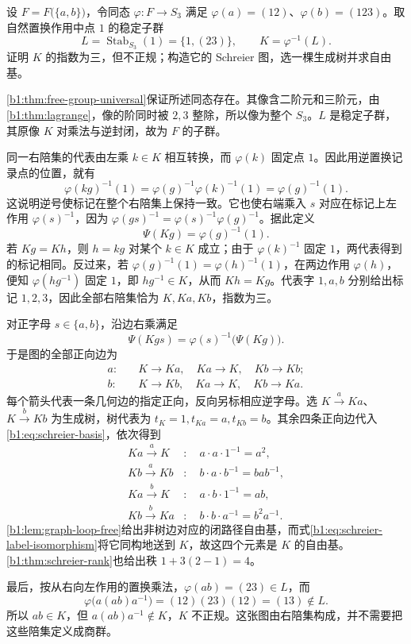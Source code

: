 \begin{optionalexercise}\label{b1:ex:08-nonnormal-schreier}
	设 \(F=F\bigl(\{a,b\}\bigr)\)，令同态 \(\varphi:F\to S_3\) 满足 \(\varphi(a)=(12)\)、\(\varphi(b)=(123)\)。取自然置换作用中点 \(1\) 的稳定子群
	\[
		L=\operatorname{Stab}_{S_3}(1)=\{1,(23)\},\qquad K=\varphi^{-1}(L).
	\]
	证明 \(K\) 的指数为三，但不正规；构造它的 Schreier 图，选一棵生成树并求自由基。
\end{optionalexercise}
\begin{solution}
	\cref{b1:thm:free-group-universal}保证所述同态存在。其像含二阶元和三阶元，由\cref{b1:thm:lagrange}，像的阶同时被 \(2,3\) 整除，所以像为整个 \(S_3\)。\(L\) 是稳定子群，其原像 \(K\) 对乘法与逆封闭，故为 \(F\) 的子群。

	同一右陪集的代表由左乘 \(k\in K\) 相互转换，而 \(\varphi(k)\) 固定点 \(1\)。因此用逆置换记录点的位置，就有
	\[
		\varphi(kg)^{-1}(1) =\varphi(g)^{-1}\varphi(k)^{-1}(1) =\varphi(g)^{-1}(1).
	\]
	这说明逆号使标记在整个右陪集上保持一致。它也使右端乘入 \(s\) 对应在标记上左作用 \(\varphi(s)^{-1}\)，因为 \(\varphi(gs)^{-1}=\varphi(s)^{-1}\varphi(g)^{-1}\)。据此定义
	\[
		\Psi(Kg)=\varphi(g)^{-1}(1).
	\]
	若 \(Kg=Kh\)，则 \(h=kg\) 对某个 \(k\in K\) 成立；由于 \(\varphi(k)^{-1}\) 固定 \(1\)，两代表得到的标记相同。反过来，若 \(\varphi(g)^{-1}(1)=\varphi(h)^{-1}(1)\)，在两边作用 \(\varphi(h)\)，便知 \(\varphi(hg^{-1})\) 固定 \(1\)，即 \(hg^{-1}\in K\)，从而 \(Kh=Kg\)。代表字 \(1,a,b\) 分别给出标记 \(1,2,3\)，因此全部右陪集恰为 \(K,Ka,Kb\)，指数为三。

	对正字母 \(s\in\{a,b\}\)，沿边右乘满足
	\[
		\Psi(Kgs)=\varphi(s)^{-1}\bigl(\Psi(Kg)\bigr).
	\]
	于是图的全部正向边为
	\[
		\begin{aligned}
			a:&\quad K\longrightarrow Ka,\quad Ka\longrightarrow K,\quad Kb\longrightarrow Kb;\\
			b:&\quad K\longrightarrow Kb,\quad Ka\longrightarrow K,\quad Kb\longrightarrow Ka.
		\end{aligned}
	\]
	每个箭头代表一条几何边的指定正向，反向另标相应逆字母。选 \(K\xrightarrow{a}Ka\)、\(K\xrightarrow{b}Kb\) 为生成树，树代表为 \(t_K=1,t_{Ka}=a,t_{Kb}=b\)。其余四条正向边代入\eqref{b1:eq:schreier-basis}，依次得到
	\[
		\begin{aligned}
			Ka\xrightarrow{a}K&:\quad a\cdot a\cdot1^{-1}=a^2,\\
			Kb\xrightarrow{a}Kb&:\quad b\cdot a\cdot b^{-1}=bab^{-1},\\
			Ka\xrightarrow{b}K&:\quad a\cdot b\cdot1^{-1}=ab,\\
			Kb\xrightarrow{b}Ka&:\quad b\cdot b\cdot a^{-1}=b^2a^{-1}.
		\end{aligned}
	\]
	\cref{b1:lem:graph-loop-free}给出非树边对应的闭路径自由基，而式\eqref{b1:eq:schreier-label-isomorphism}将它同构地送到 \(K\)，故这四个元素是 \(K\) 的自由基。\cref{b1:thm:schreier-rank}也给出秩 \(1+3(2-1)=4\)。

	最后，按从右向左作用的置换乘法，\(\varphi(ab)=(23)\in L\)，而
	\[
		\varphi\bigl(a(ab)a^{-1}\bigr)=(12)(23)(12)=(13)\notin L.
	\]
	所以 \(ab\in K\)，但 \(a(ab)a^{-1}\notin K\)，\(K\) 不正规。这张图由右陪集构成，并不需要把这些陪集定义成商群。
\end{solution}
